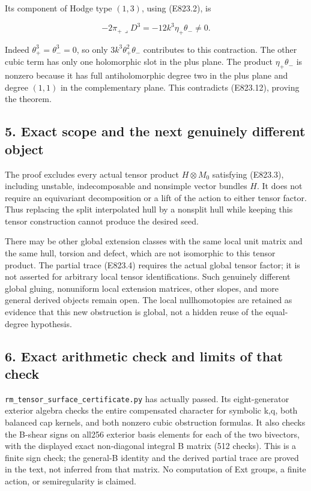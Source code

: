 Its component of Hodge type \((1,3)\), using (E823.2), is

\[
 -2\pi_+\mathbin{\lrcorner}D^3
       =-12k^3\eta_+\theta_-\ne0.
 \tag{E823.14}
\]

Indeed \(\theta_+^3=\theta_-^3=0\), so only \(3k^3\theta_+^2\theta_-\)
contributes to this contraction. The other cubic term has only one
holomorphic slot in the plus plane. The product \(\eta_+\theta_-\) is
nonzero because it has full antiholomorphic degree two in the plus plane
and degree \((1,1)\) in the complementary plane. This contradicts
(E823.12), proving the theorem.

\subsection{5. Exact scope and the next genuinely different
object}\label{SF-E823-exact-scope-and-the-next-genuinely-different-object}

The proof excludes every actual tensor product \(H\otimes M_0\)
satisfying (E823.3), including unstable, indecomposable and nonsimple
vector bundles \(H\). It does not require an equivariant decomposition
or a lift of the action to either tensor factor. Thus replacing the
split interpolated hull by a nonsplit hull while keeping this tensor
construction cannot produce the desired seed.

There may be other global extension classes with the same local unit
matrix and the same hull, torsion and defect, which are not isomorphic
to this tensor product. The partial trace (E823.4) requires the actual
global tensor factor; it is not asserted for arbitrary local tensor
identifications. Such genuinely different global gluing, nonuniform
local extension matrices, other slopes, and more general derived objects
remain open. The local nullhomotopies are retained as evidence that this
new obstruction is global, not a hidden reuse of the equal-degree
hypothesis.

\subsection{6. Exact arithmetic check and limits of that
check}\label{SF-E823-exact-arithmetic-check-and-limits-of-that-check}

\texttt{rm\_tensor\_surface\_certificate.py} has actually passed. Its
eight-generator exterior algebra checks the entire compensated character
for symbolic k,q, both balanced cap kernels, and both nonzero cubic
obstruction formulas. It also checks the B-shear signs on all256
exterior basis elements for each of the two bivectors, with the
displayed exact non-diagonal integral B matrix (512 checks). This is a
finite sign check; the general-B identity and the derived partial trace
are proved in the text, not inferred from that matrix. No computation of
Ext groups, a finite action, or semiregularity is claimed.
